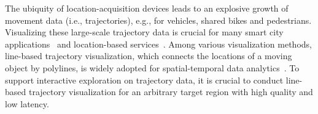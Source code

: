 The ubiquity of location-acquisition devices leads to an explosive growth of movement data (i.e., trajectories), e.g., for vehicles, shared bikes and pedestrians. Visualizing these large-scale trajectory data is crucial for many smart city applications~\cite{wang2014visual,tang2017efficient,zheng2011learning} and location-based services~\cite{liu2016smartadp, zheng2010collaborative}. Among various visualization methods, line-based trajectory visualization, which connects the locations of a moving object by polylines, is widely adopted for spatial-temporal data analytics~\cite{chen2015survey,visualanalysis,bigchanvis}. To support interactive exploration on trajectory data, it is crucial to conduct  line-based trajectory visualization for an arbitrary target region with high quality and low latency.











